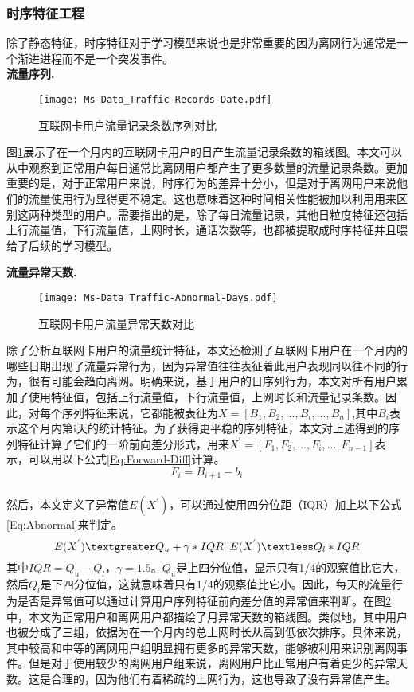 \subsubsection{时序特征工程}
除了静态特征，时序特征对于学习模型来说也是非常重要的因为离网行为通常是一个渐进进程而不是一个突发事件。\\

\textbf{流量序列.}
\begin{figure}[hbt]
	\centering
	\texttt{[image: Ms-Data\_Traffic-Records-Date.pdf]}
	\caption{互联网卡用户流量记录条数序列对比}
	\label{Fig:Traffic-Records-Date}
\end{figure}
图\ref{Fig:Traffic-Records-Date}展示了在一个月内的互联网卡用户的日产生流量记录条数的箱线图。本文可以从中观察到正常用户每日通常比离网用户都产生了更多数量的流量记录条数。更加重要的是，对于正常用户来说，时序行为的差异十分小，但是对于离网用户来说他们的流量使用行为显得更不稳定。这也意味着这种时间相关性能被加以利用用来区别这两种类型的用户。需要指出的是，除了每日流量记录，其他日粒度特征还包括上行流量值，下行流量值，上网时长，通话次数等，也都被提取成时序特征并且喂给了后续的学习模型。

\textbf{流量异常天数.}
\begin{figure}[hbt]
	\centering
	\texttt{[image: Ms-Data\_Traffic-Abnormal-Days.pdf]}
	\caption{互联网卡用户流量异常天数对比}
	\label{Fig:Traffic-Abnormal-Days}
\end{figure}
除了分析互联网卡用户的流量统计特征，本文还检测了互联网卡用户在一个月内的哪些日期出现了流量异常行为，因为异常值往往表征着此用户表现同以往不同的行为，很有可能会趋向离网。明确来说，基于用户的日序列行为，本文对所有用户累加了使用特征值，包括上行流量值，下行流量值，上网时长和流量记录条数。因此，对每个序列特征来说，它都能被表征为$X=[B_{1}, B_{2}, ..., B_{i}, ...,B_{n}]$,其中$B_{i}$表示这个月内第i天的统计特征。为了获得更平稳的序列特征，本文对上述得到的序列特征计算了它们的一阶前向差分形式，用来$X^{'}=[F_{1}, F_{2}, ..., F_{i}, ...,F_{n-1}]$表示，可以用以下公式\eqref{Eq:Forward-Diff}计算。
\begin{equation}
	F_{i} = B_{i+1} - b_{i}
	\label{Eq:Forward-Diff}
\end{equation}
\\
然后，本文定义了异常值$E(X^{'})$，可以通过使用四分位距（IQR）加上以下公式\eqref{Eq:Abnormal}来判定。
\begin{equation}
	E(X^{'}) \textgreater Q_{u} + \gamma * IQR \lvert \rvert E(X^{'}) \textless Q_{l} * IQR
	\label{Eq:Abnormal}
\end{equation}
其中$IQR=Q_{u}-Q_{l}$，$\gamma = 1.5$。$Q_{u}$是上四分位值，显示只有1/4的观察值比它大，然后$Q_{l}$是下四分位值，这就意味着只有1/4的观察值比它小。因此，每天的流量行为是否是异常值可以通过计算用户序列特征前向差分值的异常值来判断。在图\ref{Fig:Traffic-Abnormal-Days}中，本文为正常用户和离网用户都描绘了月异常天数的箱线图。类似地，其中用户也被分成了三组，依据为在一个月内的总上网时长从高到低依次排序。具体来说，其中较高和中等的离网用户组明显拥有更多的异常天数，能够被利用来识别离网事件。但是对于使用较少的离网用户组来说，离网用户比正常用户有着更少的异常天数。这是合理的，因为他们有着稀疏的上网行为，这也导致了没有异常值产生。

